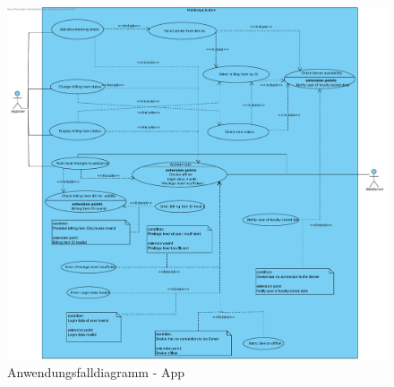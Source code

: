 \begin{figure}[h]
	\centering
    \includegraphics[width=\linewidth]{img/diagrams/Mobile_Application.pdf}
	\caption{Anwendungsfalldiagramm - App}
	\label{fig:anwendungsfalldiagramm-app}
\end{figure}

\newpage

